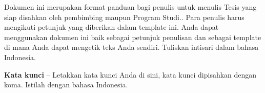 Dokumen ini merupakan format panduan bagi penulis untuk menulis Tesis yang siap disahkan oleh pembimbing maupun Program Studi.. Para penulis harus mengikuti petunjuk yang diberikan dalam template ini. Anda dapat menggunakan dokumen ini baik sebagai petunjuk penulisan dan sebagai template di mana Anda dapat mengetik teks Anda sendiri. Tuliskan intisari dalam bahasa Indonesia.


\noindent\textbf{Kata kunci} -- Letakkan kata kunci Anda di sini, kata kunci dipisahkan dengan koma. Istilah dengan bahasa Indonesia.
